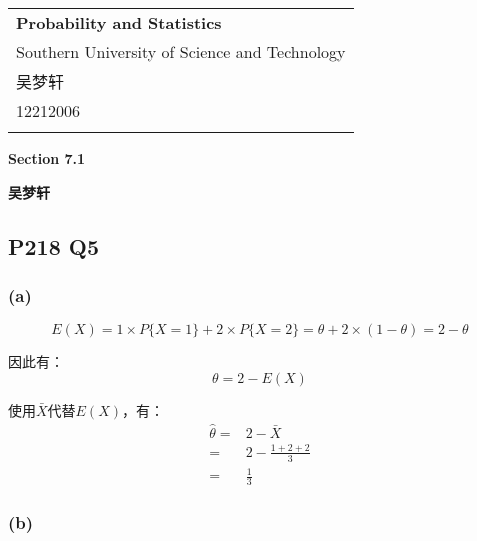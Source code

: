 \documentclass[a4paper,12pt]{ctexart}
\begin{document}
\thispagestyle{empty} %

\begin{tabular}{p{15.5cm}}
{\large \bf Probability and Statistics} \\
Southern University of Science and Technology \\ 吴梦轩 \\ 12212006 \\
\hline
\\
\end{tabular}

\vspace*{0.3cm} %

\begin{center}
	{\Large \bf Section 7.1}
	\vspace{2mm}

	{\bf 吴梦轩}
		
\end{center}  

\vspace{0.4cm}

\subsection*{P218 Q5}

\subsubsection*{(a)}

\begin{equation*}
	E(X) = 1 \times P\{X = 1\} + 2 \times P\{X = 2\} = \theta + 2 \times (1 - \theta) = 2 - \theta
\end{equation*}

因此有：
\begin{equation*}
	\theta = 2 - E(X)
\end{equation*}

使用$\bar{X}$代替$E(X)$，有：
\begin{align*}
	\hat{\theta} =& 2 - \bar{X} \\
	=& 2 - \frac{1 + 2 + 2}{3} \\
	=& \frac{1}{3}
\end{align*}

\subsubsection*{(b)}
\end{document}
